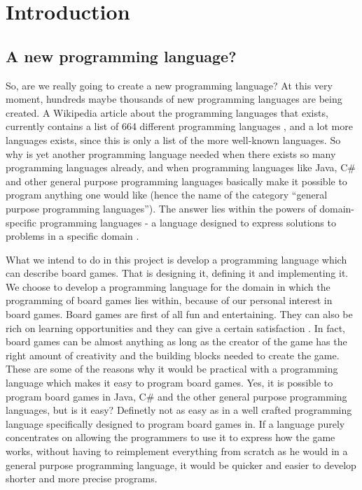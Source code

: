 \chapter{Introduction}
\label{chap:introduction}

\section{A new programming language?}
So, are we really going to create a new programming language? At this very moment, hundreds maybe thousands of new programming languages are being created. A Wikipedia article about the programming languages that exists, currently contains a list of 664 different programming languages \cite{listofprogramminglanguages}, and a lot more languages exists, since this is only a list of the more well-known languages. So why is yet another programming language needed when there exists so many programming languages already, and when programming languages like Java, C\# and other general purpose programming languages basically make it possible to program anything one would like (hence the name of the category ``general purpose programming languages''). The answer lies within the powers of domain-specific programming languages - a language designed to express solutions to problems in a specific domain \cite{domainspecificprogramminglanguagedefinition}. 

What we intend to do in this project is develop a programming language which can describe board games. That is designing it, defining it and implementing it. We choose to develop a programming language for the domain in which the programming of board games lies within, because of our personal interest in board games. Board games are first of all fun and entertaining. They can also be rich on learning opportunities \cite{whyboardgames1?} and they can give a certain satisfaction \cite{whyboardgames2?}. In fact, board games can be almost anything as long as the creator of the game has the right amount of creativity and the building blocks needed to create the game. These are some of the reasons why it would be practical with a programming language which makes it easy to program board games. Yes, it is possible to program board games in Java, C\# and the other general purpose programming languages, but is it easy? Definetly not as easy as in a well crafted programming language specifically designed to program board games in. If a language purely concentrates on allowing the programmers to use it to express how the game works, without having to reimplement everything from scratch as he would in a general purpose programming language, it would be quicker and easier to develop shorter and more precise programs.  

